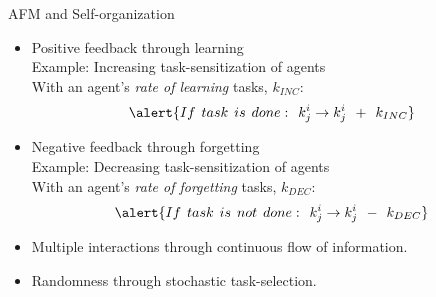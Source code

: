 \documentclass{beamer}
\begin{document}
\begin{frame}[t]{AFM and Self-organization}
  \begin{itemize}
    \item \alert{Positive feedback} through learning\\ Example: Increasing task-sensitization of agents\\
With  an agent's \textit{rate of learning} tasks, $k_{INC}$:
\begin{equation}
\alert{ 
 If\hspace*{0.15cm}task\hspace*{0.15cm}is\hspace*{0.15cm}done:\hspace*{0.15cm}  k^i_j \rightarrow   k^i_j \hspace*{0.15cm} + \hspace*{0.15cm} k_{INC}
 }
\label{eqn:k-inc}
\end{equation} 
    \item \alert{Negative feedback} through forgetting\\ Example: Decreasing task-sensitization of agents\\
    With an agent's \textit{rate of forgetting} tasks, $k_{DEC}$:
\begin{equation}
\alert{
 If\hspace*{0.15cm}task\hspace*{0.15cm}is\hspace*{0.15cm}not\hspace*{0.15cm}done:\hspace*{0.15cm}  k^i_j \rightarrow   k^i_j \hspace*{0.15cm} - \hspace*{0.15cm} k_{DEC}
 }
\label{eqn:k-dec}
\end{equation}   	
	\item \alert{Multiple interactions} through continuous flow of information.
	
	\item \alert{Randomness} through stochastic task-selection.
    \end{itemize}
\end{frame}
\end{document}

